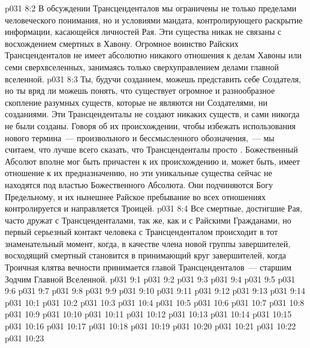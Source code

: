 \vs p031 8:2 В обсуждении Трансценденталов мы ограничены не только пределами человеческого понимания, но и условиями мандата, контролирующего раскрытие информации, касающейся личностей Рая. Эти существа никак не связаны с восхождением смертных в Хавону. Огромное воинство Райских Трансценденталов не имеет абсолютно никакого отношения к делам Хавоны или семи сверхвселенных, занимаясь только сверхуправлением делами главной вселенной.
\vs p031 8:3 Ты, будучи созданием, можешь представить себе Создателя, но ты вряд ли можешь понять, что существует огромное и разнообразное скопление разумных существ, которые не являются ни Создателями, ни созданиями. Эти Трансценденталы не создают никаких существ, и сами никогда не были созданы. Говоря об их происхождении, чтобы избежать использования нового термина~--- произвольного и бессмысленного обозначения,~--- мы считаем, что лучше всего сказать, что Трансценденталы просто . Божественный Абсолют вполне мог быть причастен к их происхождению и, может быть, имеет отношение к их предназначению, но эти уникальные существа сейчас не находятся под властью Божественного Абсолюта. Они подчиняются Богу Предельному, и их нынешнее Райское пребывание во всех отношениях контролируется и направляется Троицей.
\vs p031 8:4 Все смертные, достигшие Рая, часто дружат с Трансценденталами, так же, как и с Райскими Гражданами, но первый серьезный контакт человека с Трансценденталом происходит в тот знаменательный момент, когда, в качестве члена новой группы завершителей, восходящий смертный становится в принимающий круг завершителей, когда Троичная клятва вечности принимается главой Трансценденталов~--- старшим Зодчим Главной Вселенной.
\vs p031 9:1 
\vs p031 9:2 
\vs p031 9:3 
\vs p031 9:4 
\vs p031 9:5 
\vs p031 9:6 
\vs p031 9:7 
\vs p031 9:8 
\vs p031 9:9 
\vs p031 9:10 \pc 
\vs p031 9:11 \pc 
\vs p031 9:12 
\vs p031 9:13 
\vs p031 9:14 
\vs p031 10:1 
\vs p031 10:2 
\vs p031 10:3 
\vs p031 10:4 
\vs p031 10:5 
\vs p031 10:6 
\vs p031 10:7 
\vs p031 10:8 
\vs p031 10:9 
\vs p031 10:10 
\vs p031 10:11 
\vs p031 10:12 
\vs p031 10:13 
\vs p031 10:14 
\vs p031 10:15 
\vs p031 10:16 
\vs p031 10:17 
\vs p031 10:18 
\vs p031 10:19 \pc 
\vs p031 10:20 \pc 
\vsetoff
\vs p031 10:21 
\vs p031 10:22 
\vs p031 10:23 
\quizlink
